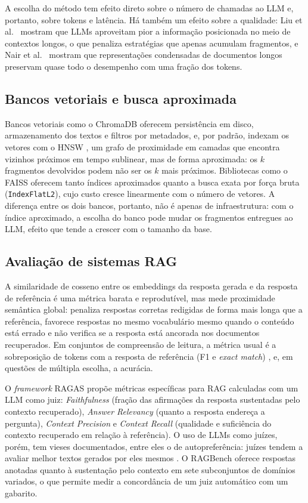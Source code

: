 A escolha do método tem efeito direto sobre o número de chamadas ao LLM e, portanto, sobre tokens e latência. Há também um efeito sobre a qualidade: Liu et al.~\cite{liu2023lost} mostram que LLMs aproveitam pior a informação posicionada no meio de contextos longos, o que penaliza estratégias que apenas acumulam fragmentos, e Nair et al.~\cite{nair2023drilling} mostram que representações condensadas de documentos longos preservam quase todo o desempenho com uma fração dos tokens.

\subsection{Bancos vetoriais e busca aproximada}

Bancos vetoriais como o ChromaDB oferecem persistência em disco, armazenamento dos textos e filtros por metadados, e, por padrão, indexam os vetores com o HNSW \cite{malkov2020hnsw}, um grafo de proximidade em camadas que encontra vizinhos próximos em tempo sublinear, mas de forma aproximada: os $k$ fragmentos devolvidos podem não ser os $k$ mais próximos. Bibliotecas como o FAISS \cite{johnson2021faiss} oferecem tanto índices aproximados quanto a busca exata por força bruta (\texttt{IndexFlatL2}), cujo custo cresce linearmente com o número de vetores. A diferença entre os dois bancos, portanto, não é apenas de infraestrutura: com o índice aproximado, a escolha do banco pode mudar os fragmentos entregues ao LLM, efeito que tende a crescer com o tamanho da base.

\subsection{Avaliação de sistemas RAG}

A similaridade de cosseno entre os embeddings da resposta gerada e da resposta de referência é uma métrica barata e reprodutível, mas mede proximidade semântica global: penaliza respostas corretas redigidas de forma mais longa que a referência, favorece respostas no mesmo vocabulário mesmo quando o conteúdo está errado e não verifica se a resposta está ancorada nos documentos recuperados. Em conjuntos de compreensão de leitura, a métrica usual é a sobreposição de tokens com a resposta de referência (F1 e \emph{exact match}) \cite{rajpurkar2016squad}, e, em questões de múltipla escolha, a acurácia.

O \emph{framework} RAGAS \cite{es2024ragas} propõe métricas específicas para RAG calculadas com um LLM como juiz: \emph{Faithfulness} (fração das afirmações da resposta sustentadas pelo contexto recuperado), \emph{Answer Relevancy} (quanto a resposta endereça a pergunta), \emph{Context Precision} e \emph{Context Recall} (qualidade e suficiência do contexto recuperado em relação à referência). O uso de LLMs como juízes, porém, tem vieses documentados, entre eles o de autopreferência: juízes tendem a avaliar melhor textos gerados por eles mesmos \cite{zheng2023judging, panickssery2024selfpref}. O RAGBench \cite{friel2024ragbench} oferece respostas anotadas quanto à sustentação pelo contexto em sete subconjuntos de domínios variados, o que permite medir a concordância de um juiz automático com um gabarito.

